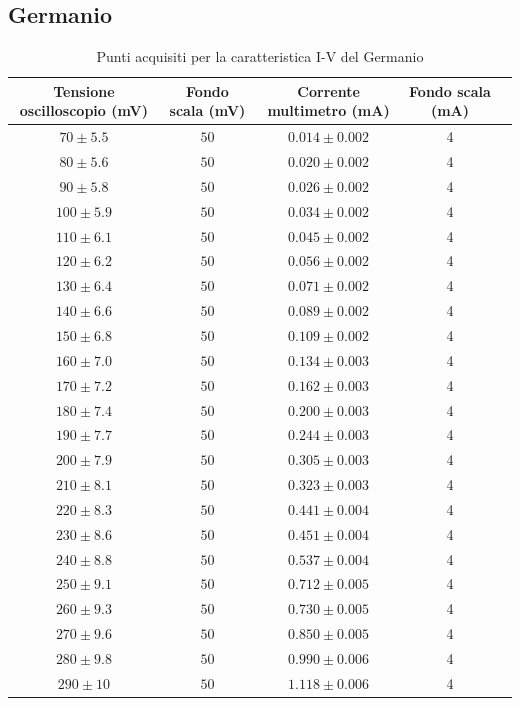 \documentclass[]{article}
\begin{document}
\subsection{Germanio}
\begin{center}
	\begin{table}[H]
	\begin{tabular}{|c|c|c|c|c|}
		\hline
		Tensione oscilloscopio (mV)& Fondo scala (mV) & Corrente multimetro (mA) &Fondo scala (mA)\\
		\hline
		$ 70\pm 5.5 $ &$ 50 $ & $ 0.014\pm 0.002 $ &4 \\
		\hline
		$ 80\pm 5.6$ &$ 50 $ & $ 0.020\pm 0.002 $&4 \\
		\hline
		$ 90\pm 5.8$ &$ 50 $ & $ 0.026\pm 0.002 $&4 \\
		\hline
		$ 100\pm 5.9 $ &$ 50 $ & $ 0.034\pm 0.002 $&4 \\
		\hline
		$110\pm 6.1 $ &$ 50 $ & $ 0.045\pm 0.002 $&4 \\
		\hline
		$ 120\pm 6.2 $ &$ 50 $ & $ 0.056\pm 0.002 $&4 \\
		\hline
		$ 130\pm 6.4$ &$ 50 $ & $ 0.071\pm 0.002 $&4 \\
		\hline
		$ 140\pm 6.6$ &$ 50 $ & $ 0.089\pm 0.002 $&4 \\
		\hline
		$ 150\pm 6.8$ &$ 50 $ & $ 0.109\pm 0.002 $&4 \\
		\hline
		$ 160\pm 7.0$ &$ 50 $ & $ 0.134\pm 0.003 $&4 \\
		\hline
		$ 170\pm 7.2$ &$ 50 $ & $ 0.162\pm 0.003 $&4 \\
		\hline
		$ 180\pm 7.4$ &$ 50 $ & $ 0.200\pm 0.003 $&4 \\
		\hline
		$ 190\pm 7.7$ &$ 50 $ & $ 0.244\pm 0.003 $&4 \\
		\hline
		$ 200\pm 7.9$ &$ 50 $ & $ 0.305\pm 0.003 $&4 \\
		\hline
		$ 210\pm 8.1$ &$ 50 $ & $ 0.323\pm 0.003 $&4 \\
		\hline
		$ 220\pm 8.3$ &$ 50 $ & $ 0.441\pm 0.004 $&4 \\
		\hline
		$ 230\pm 8.6$ &$ 50 $ & $ 0.451\pm 0.004 $&4 \\
		\hline
		$ 240\pm 8.8$ &$ 50 $ & $ 0.537\pm 0.004 $&4 \\
		\hline
		$ 250\pm 9.1$ &$ 50 $ & $ 0.712\pm 0.005 $&4 \\
		\hline
		$ 260\pm 9.3$ &$ 50 $ & $ 0.730\pm 0.005 $&4 \\
		\hline
		$ 270\pm 9.6$ &$ 50 $ & $ 0.850\pm 0.005 $&4 \\
		\hline
		$ 280\pm 9.8$ &$ 50 $ & $ 0.990\pm 0.006 $&4 \\
		\hline
		$ 290\pm 10$ &$ 50 $ & $ 1.118\pm 0.006 $&4 \\
		\hline
	\end{tabular}
\caption{Punti acquisiti per la caratteristica I-V del Germanio}
\label{tab:germanio}
\end{table}
\end{center}
\end{document}

